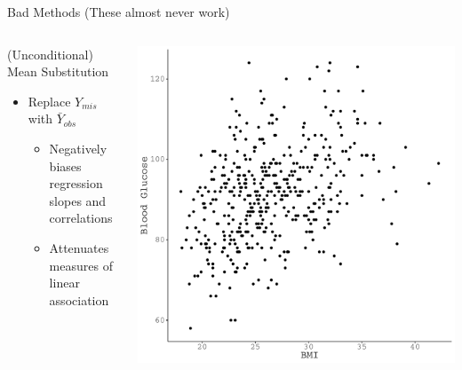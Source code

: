 \documentclass{beamer}\usepackage[]{graphicx}\usepackage[]{color}
\makeatletter
\def\maxwidth{ %
  \ifdim\Gin@nat@width>\linewidth
    \linewidth
  \else
    \Gin@nat@width
  \fi
}
\newenvironment{knitrout}{}{} %
\makeatother
\begin{document}
\begin{frame}{Bad Methods (These almost never work)}
  
  \begin{columns}
    \begin{column}{0.5\textwidth}
      
      (Unconditional) Mean Substitution
      \begin{itemize}
      \item Replace $Y_{mis}$ with $\bar{Y}_{obs}$
        \begin{itemize}
        \item Negatively biases regression slopes and correlations
        \item Attenuates measures of linear association
        \end{itemize}
      \end{itemize}
      
    \end{column}
    \begin{column}{0.5\textwidth}
      
\begin{knitrout}\footnotesize
{}\color{fgcolor}

{\centering \includegraphics[width=\maxwidth]{figure/intro-unnamed-chunk-20-1} 

}


\end{knitrout}

\end{column}
\end{columns}

\end{frame}
\end{document}
